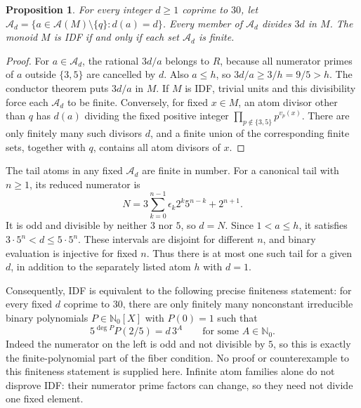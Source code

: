 \documentclass[11pt]{article}
\newtheorem{proposition}[theorem]{Proposition}
\theoremstyle{definition}
\newcommand{\NN}{\mathbb N}
\newcommand{\A}{\mathcal A}
\begin{document}
\begin{proposition}\label{prop:idf}
For every integer $d\ge1$ coprime to $30$, let
$\A_d=\{a\in\A(M)\setminus\{q\}:d(a)=d\}$.
Every member of $\A_d$ divides $3d$ in $M$.
The monoid $M$ is IDF if and only if each set $\A_d$ is finite.
\end{proposition}
\begin{proof}
For $a\in\A_d$, the rational $3d/a$ belongs to $R$, because all
numerator primes of $a$ outside $\{3,5\}$ are cancelled by $d$.
Also $a\le h$, so $3d/a\ge3/h=9/5>h$.
The conductor theorem puts $3d/a$ in $M$.
If $M$ is IDF, trivial units and this divisibility force each
$\A_d$ to be finite.
Conversely, for fixed $x\in M$, an atom divisor other than $q$ has
$d(a)$ dividing the fixed positive integer
$\prod_{p\notin\{3,5\}}p^{v_p(x)}$. There are only finitely many
such divisors $d$, and a finite union of the corresponding finite
sets, together with $q$, contains all atom divisors of $x$.
\end{proof}

The tail atoms in any fixed $\A_d$ are finite in number.
For a canonical tail with $n\ge1$, its reduced numerator is
\[
 N=3\sum_{k=0}^{n-1}\epsilon_k2^k5^{n-k}+2^{n+1}.
\]
It is odd and divisible by neither $3$ nor $5$, so $d=N$.
Since $1<a\le h$, it satisfies $3\cdot5^n<d\le5\cdot5^n$.
These intervals are disjoint for different $n$, and binary evaluation
is injective for fixed $n$. Thus there is at most one such tail for
a given $d$, in addition to the separately listed atom $h$ with $d=1$.

Consequently, IDF is equivalent to the following precise finiteness
statement: for every fixed $d$ coprime to $30$, there are only finitely
many nonconstant irreducible binary polynomials $P\in\NN_0[X]$ with
$P(0)=1$ such that
\begin{equation}\label{eq:idfremaining}
 5^{\deg P}P(2/5)=d\,3^A\qquad\text{for some }A\in\NN_0.
\end{equation}
Indeed the numerator on the left is odd and not divisible by $5$,
so this is exactly the finite-polynomial part of the fiber condition.
No proof or counterexample to this finiteness statement is supplied
here. Infinite atom families alone do not disprove IDF: their numerator
prime factors can change, so they need not divide one fixed element.
\end{document}
